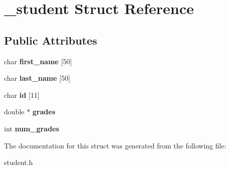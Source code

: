 \hypertarget{struct__student}{}\section{\+\_\+student Struct Reference}
\label{struct__student}
\subsection*{Public Attributes}
\begin{DoxyCompactItemize}
\item 
\mbox{\label{struct__student_a272ec3136434e8d3281a615cf31cc987}} 
char {\bfseries first\+\_\+name} \mbox{[}50\mbox{]}
\item 
\mbox{\label{struct__student_a18eb2a90671a2292c017b8f4fbde7eec}} 
char {\bfseries last\+\_\+name} \mbox{[}50\mbox{]}
\item 
\mbox{\label{struct__student_adaee78078859cdecdbe9128dd655b748}} 
char {\bfseries id} \mbox{[}11\mbox{]}
\item 
\mbox{\label{struct__student_ad0f75a9ff0f6104eb9e3bb3c4f7ad97b}} 
double $\ast$ {\bfseries grades}
\item 
\mbox{\label{struct__student_a6592ee968ed2226737f45243e7602636}} 
int {\bfseries num\+\_\+grades}
\end{DoxyCompactItemize}


The documentation for this struct was generated from the following file\+:\begin{DoxyCompactItemize}
\item 
student.\+h\end{DoxyCompactItemize}
